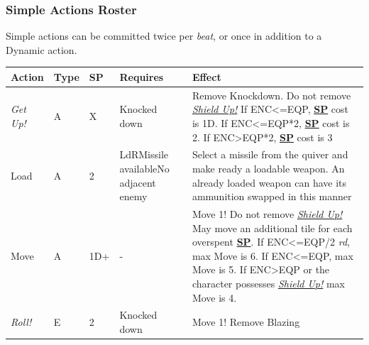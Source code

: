 \documentclass[12pt]{article}
\newcommand{\refto}[1]{\hyperlink{#1}{\textbf{#1}}}
\newcommand{\reftoit}[1]{\hyperlink{#1}{\emph{#1}}}
\begin{document}
\renewcommand{\arraystretch}{1.5}

\subsubsection{Simple Actions Roster}
Simple actions can be committed twice per \emph{beat}, or once in addition to a Dynamic action.\\

\begin{center}
\begin{tabularx}{\textwidth}{p{}p{}p{}p{}p{}}
\hline
\rowcolor{white} \textbf{Action} & \textbf{Type} & \textbf{SP} & \textbf{Requires} & \textbf{Effect}\setcounter{rownum}{0}\\
\hline
\emph{Get Up!} & A & X & Knocked down & Remove Knockdown.\newline
Do not remove \reftoit{Shield Up!}\newline
If ENC<=EQP, \refto{SP} cost is 1D.\newline
If ENC<=EQP*2, \refto{SP} cost is 2.\newline
If ENC>EQP*2, \refto{SP} cost is 3\\
Load & A & 2 & LdR\newline Missile available\newline No adjacent enemy & Select a missile from the quiver and make ready a loadable weapon. An already loaded weapon can have its ammunition swapped in this manner\\
Move & A & 1D+ & - & Move 1!\newline
Do not remove \reftoit{Shield Up!}\newline
May move an additional tile for each overspent \refto{SP}.\newline
If ENC<=EQP/2 \emph{rd}, max Move is 6.\newline
If ENC<=EQP, max Move is 5.\newline
If ENC>EQP or the character possesses \reftoit{Shield Up!} max Move is 4.\setcounter{rownum}{0}\\
\rowcolor{white} \emph{Roll!} & E & 2 & Knocked down & Move 1!\newline
Remove Blazing\\
\hline
\end{tabularx}
\end{center}

\pagebreak
\end{document}
